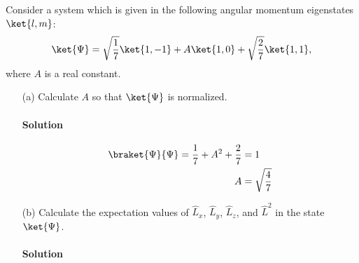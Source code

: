 \documentclass{article}
\begin{document}
	Consider a system which is given in the following angular momentum eigenstates $\ket{l,m}$:
	\begin{equation} \label{eq:4}
		\ket{\Psi} = \sqrt{\frac{1}{7}} \ket{1,-1} + A\ket{1,0} + \sqrt{\frac{2}{7}} \ket{1,1}, 
	\end{equation}
	where $A$ is a real constant.
	\begin{enumerate}
		\item[(a)] Calculate $A$ so that $\ket{\Psi}$ is normalized.
		\paragraph{Solution}
		\begin{equation}
			\begin{aligned}[b]
				\braket{\Psi}{\Psi} = \frac{1}{7} + A^2 + \frac{2}{7} &= 1 \\
																	A &= \sqrt{\frac{4}{7}}
			\end{aligned}
		\end{equation}
		
		\item[(b)] Calculate the expectation values of $\hat{L}_x$, $\hat{L}_y$, $\hat{L}_z$, and $\hat{L}^2$ in the state $\ket{\Psi}$.
		\paragraph{Solution}
		

\end{enumerate}
\end{document}
